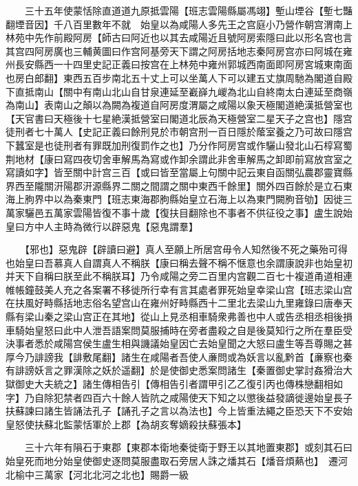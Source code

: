 　　三十五年使蒙恬除直道道九原抵雲陽【班志雲陽縣屬馮翊】塹山堙谷【塹七豔翻堙音因】千八百里數年不就　始皇以為咸陽人多先王之宫庭小乃營作朝宫渭南上林苑中先作前殿阿房【師古曰阿近也以其去咸陽近且號阿房索隱曰此以形名宫也言其宫四阿房廣也三輔黄圖曰作宫阿基旁天下謂之阿房括地志秦阿房宫亦曰阿城在雍州長安縣西一十四里史記正義曰按宫在上林苑中雍州郭城西南面即阿房宮城東南面也房白郎翻】東西五百步南北五十丈上可以坐萬人下可以建五丈旗周馳為閣道自殿下直抵南山【關中有南山北山自甘泉連延至嶻嶭九嵕為北山自終南太白連延至商嶺為南山】表南山之顛以為闕為複道自阿房度渭屬之咸陽以象天極閣道絶漢抵營室也【天官書曰天極後十七星絶漢抵營室曰閣道北辰為天極營室二星天子之宫也】隱宫徒刑者七十萬人【史記正義曰餘刑見於市朝宫刑一百日隱於䕃室養之乃可故曰隱宫下蠶室是也徒刑者有罪既加刑復罰作之也】乃分作阿房宫或作驪山發北山石椁寫蜀荆地材【康曰寫四夜切舍車解馬為寫或作卸余謂此非舍車解馬之卸即前寫放宫室之寫讀如字】皆至關中計宫三百【或曰皆至當屬上句關中記云東自函關弘農郡靈寶縣界西至隴關汧陽郡汧源縣界二關之間謂之關中東西千餘里】關外四百餘於是立石東海上朐界中以為秦東門【班志東海郡朐縣始皇立石海上以為東門闕朐音劬】因徙三萬家驪邑五萬家雲陽皆復不事十歲【復扶目翻除也不事者不供征役之事】盧生說始皇曰方中人主時為微行以辟惡鬼【惡鬼謂羣】

　　【邪也】惡鬼辟【辟讀曰避】真人至願上所居宫毋令人知然後不死之藥殆可得也始皇曰吾慕真人自謂真人不稱朕【康曰稱去聲不稱不惬意也余謂康說非也始皇初并天下自稱曰朕至此不稱朕耳】乃令咸陽之旁二百里内宫觀二百七十複道甬道相連帷帳鐘鼓美人充之各案署不移徙所行幸有言其處者罪死始皇幸梁山宫【班志梁山宫在扶風好畤縣括地志俗名望宫山在雍州好畤縣西十二里北去梁山九里雍錄曰唐奉天縣有梁山秦之梁山宫正在其地】從山上見丞相車騎衆弗善也中人或告丞相丞相後損車騎始皇怒曰此中人泄吾語案問莫服捕時在旁者盡殺之自是後莫知行之所在羣臣受決事者悉於咸陽宫侯生盧生相與譏議始皇因亡去始皇聞之大怒曰盧生等吾尊賜之甚厚今乃誹謗我【誹敷尾翻】諸生在咸陽者吾使人亷問或為妖言以亂黔首【亷察也秦有誹謗妖言之罪漢除之妖於遥翻】於是使御史悉案問諸生【秦置御史掌討姦猾治大獄御史大夫統之】諸生傳相告引【傳相告引者謂甲引乙乙復引丙也傳株戀翻相如字】乃自除犯禁者四百六十餘人皆阬之咸陽使天下知之以懲後益發謫徙邊始皇長子扶蘇諫曰諸生皆誦法孔子【誦孔子之言以為法也】今上皆重法繩之臣恐天下不安始皇怒使扶蘇北監蒙恬軍於上郡【為胡亥奪嫡殺扶蘇張本】

　　三十六年有隕石于東郡【東郡本衛地秦徙衛于野王以其地置東郡】或刻其石曰始皇死而地分始皇使御史逐問莫服盡取石旁居人誅之燔其石【燔音煩爇也】　遷河北榆中三萬家【河北北河之北也】賜爵一級

